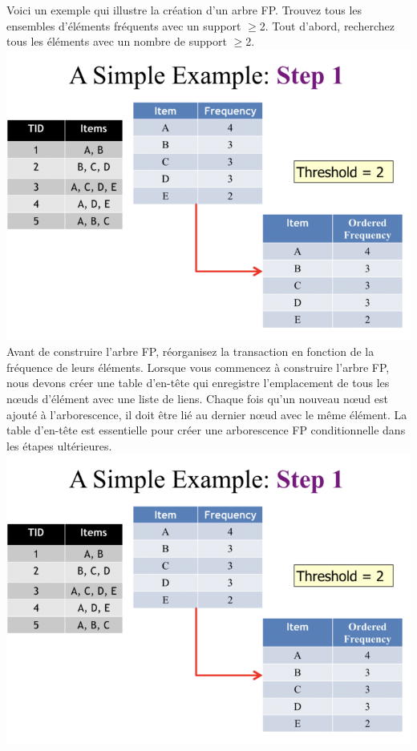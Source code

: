 \documentclass[a4paper,12pt]{article}
\begin{document}
Voici un exemple qui illustre la création d’un arbre FP. Trouvez tous les ensembles d'éléments
fréquents avec un support  $\geq$2. Tout d'abord, recherchez tous les éléments avec un nombre de support $\geq$2.\\
\includegraphics[width=\textwidth]{one}
Avant de construire l'arbre FP, réorganisez la transaction en fonction de la fréquence de leurs éléments. Lorsque vous commencez à construire l'arbre FP, nous devons créer une table d'en-tête qui enregistre l'emplacement de tous les nœuds d'élément avec une liste de liens. Chaque fois qu'un nouveau nœud est ajouté à l'arborescence, il doit être lié au dernier nœud avec le même élément. La table d'en-tête est essentielle pour créer une arborescence FP conditionnelle dans les étapes ultérieures.\\
\includegraphics[width=\textwidth]{one}
\end{document}
